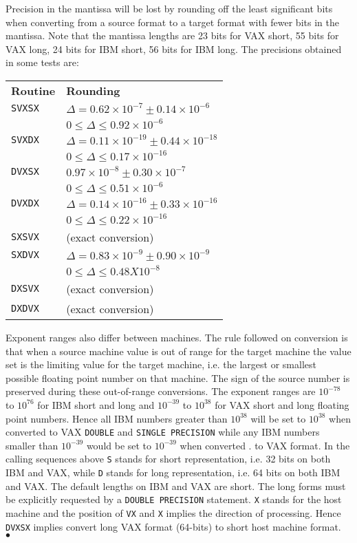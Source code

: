 \newpage
\Accuracy
Precision in the mantissa will be lost by rounding off the least
significant bits when converting from a source format to a target
format with fewer bits in the mantissa. Note that the mantissa
lengths are 23 bits for VAX short, 55 bits for VAX long, 24 bits for
IBM short, 56 bits for IBM long. The precisions obtained in some
tests are:
\begin {center} \begin{tabular}{l@{\qquad}l}
{\bf Routine}     &  {\bf Rounding}              \\[2mm]
{\tt SVXSX} & $\Delta=0.62 \times 10^{-7}\pm 0.14 \times 10^{-6}$\\[1mm]
            & $0\leq \Delta \leq 0.92 \times 10^{-6}$\\[2mm]
{\tt SVXDX} & $\Delta =0.11 \times 10^{-19}\pm 0.44 \times 10^{-18}$
\\[1mm]
            &  $ 0\leq \Delta\leq 0.17  \times 10^{-16}$\\[2mm]
{\tt DVXSX} & $ 0.97 \times 10^{-8}\pm 0.30  \times 10^{-7}$\\[1mm]
            & $ 0\leq\Delta\leq 0.51 \times 10^{-6}$\\[2mm]
{\tt DVXDX} & $\Delta=0.14  \times 10^{-16}\pm 0.33  \times 10^{-16}$
\\[1mm]
            & $ 0\leq \Delta\leq 0.22  \times 10^{-16}$\\[2mm]
{\tt SXSVX} & (exact conversion) \\[2mm]
{\tt SXDVX} & $\Delta=0.83 \times 10^{-9}\pm 0.90 \times 10^{-9}$\\[1mm]
            & $0\leq \Delta\leq 0.48X10^{-8}$\\[2mm]
{\tt DXSVX} & (exact conversion) \\[2mm]
{\tt DXDVX} & (exact conversion) \\
\end{tabular} \end{center}
Exponent ranges also differ between machines. The rule
followed on conversion is that when a source machine value is out of
range for the target machine the value set is the limiting value for
the target machine, i.e. the largest or smallest possible floating
point number on that machine. The sign of the source
number is preserved during these out-of-range conversions. The
exponent ranges are $10^{-78}$ to $10^{76}$ for IBM short and long and
$10^{-39}$ to $10^{38}$ for VAX short and long floating point numbers.
Hence all IBM numbers greater than $10^{38}$ will be set to $10^{38}$
when converted to VAX {\tt DOUBLE} and {\tt SINGLE PRECISION} while any
IBM numbers smaller than $10^{-39}$ would be set to $10^{-39}$ when
converted .
to VAX format.
\Notes
In the calling sequences above {\tt S} stands for short
representation, i.e. 32 bits on both IBM and VAX,
while {\tt D} stands for long representation, i.e. 64
bits on both IBM and VAX. The default lengths
on IBM and VAX are short. The long forms must be explicitly
requested by a {\tt DOUBLE PRECISION} statement. {\tt X} stands for the
host machine and the position of {\tt VX} and {\tt X} implies the
direction of processing. Hence {\tt DVXSX} implies convert long VAX
format (64-bits) to short host machine format.
\\ $\bullet$
